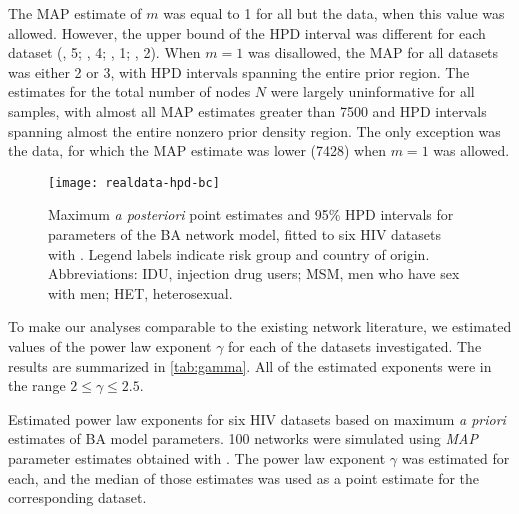The MAP estimate of $m$ was equal to 1 for all but the
\citeauthor{novitsky2014impact} data, when this value was allowed. However, the
upper bound of the HPD interval was different for each dataset
  (\citeauthor{niculescu2015recent}, 5;
   \citeauthor{wang2015targeting}, 4;
   \citeauthor{li2015hiv}, 1;
   \citeauthor{cuevas2009hiv}, 2).
When $m = 1$ was disallowed, the MAP for all datasets was either 2 or 3, with
HPD intervals spanning the entire prior region. The estimates for the total
number of nodes $N$ were largely uninformative for all samples, with almost all
MAP estimates greater than 7500 and HPD intervals spanning almost the entire
nonzero prior density region. The only exception was the \citeauthor{li2015hiv}
data, for which the MAP estimate was lower 
  (7428)
when $m = 1$ was allowed.

\begin{figure*}[ht]
  \centering
  \texttt{[image: realdata-hpd-bc]}
  \caption[
      Maximum \textit{a posteriori} point estimates and 95\% HPD intervals for
      parameters of the BA network model, fitted to six HIV datasets
      with .]
  {
      Maximum \textit{a posteriori} point estimates and 95\% HPD intervals for
      parameters of the BA network model, fitted to six HIV datasets with
      . Legend labels indicate risk group and country of
      origin. Abbreviations: IDU, injection drug users; MSM, men who have sex
      with men; HET, heterosexual.
  }
  \label{fig:abchpd}
\end{figure*}

{\color{blue}
To make our analyses comparable to the existing network literature, we
estimated values of the power law exponent $\gamma$ for each of the datasets 
investigated. The results are summarized in \cref{tab:gamma}. All of the
estimated exponents were in the range $2 \leq \gamma \leq 2.5$. 

\begin{table}
    \centering
    
    \caption[
        Estimated power law exponents for six HIV datasets based on maximum
        \textit{a priori} estimates of BA model parameters.
    ]{
        Estimated power law exponents for six HIV datasets based on maximum
        \textit{a priori} estimates of BA model parameters. 100 networks were
        simulated using \textit{MAP} parameter estimates obtained with
        . The power law exponent $\gamma$ was estimated for
        each, and the median of those estimates was used as a point estimate
        for the corresponding dataset.
    }
    \label{tab:gamma}
\end{table}
}
